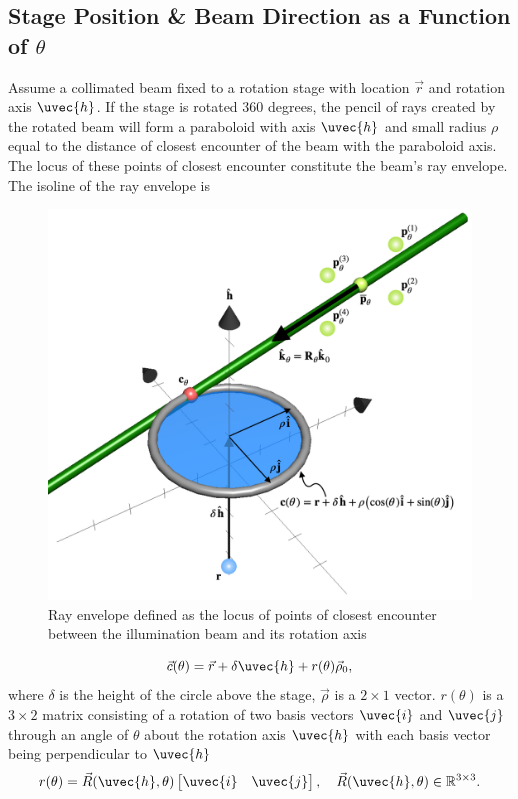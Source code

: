\subsection{Stage Position \& Beam Direction as a Function of $\theta$}
Assume a collimated beam fixed to a rotation stage with location $\vec{r}$ and rotation axis $\uvec{h}$. If the stage is rotated 360 degrees, the pencil of rays created by the rotated beam will form a paraboloid with axis $\uvec{h}$ and small radius $\rho$ equal to the distance of closest encounter of the beam with the paraboloid axis. The locus of these points of closest encounter constitute the beam's ray envelope. The isoline of the ray envelope is
%
\begin{figure}
    \centering
    \includegraphics[width=0.5\linewidth]{figures/ray_envelope.png}
    \caption{Ray envelope defined as the locus of points of closest encounter between the illumination beam and its rotation axis}
    \label{fig:ray_envelope_geometry}
\end{figure}
%
\begin{equation}
    \vec{c}(\theta) = \vec{r} + \delta \uvec{h} + r(\theta) \vec{\rho}_0,
    \label{eqn:envelope2}
\end{equation}
%
where $\delta$ is the height of the circle above the stage, $\vec{\rho}$ is a $2 \times 1$ vector. $r(\theta)$ is a $3 \times 2$ matrix consisting of a rotation of two basis vectors $\uvec{i}$ and $\uvec{j}$ through an angle of $\theta$ about the rotation axis $\uvec{h}$ with each basis vector being perpendicular to $\uvec{h}$
%
\begin{equation}
    r(\theta) = \vec{R}(\uvec{h}, \theta) \begin{bmatrix}
        \uvec{i} & \uvec{j}
    \end{bmatrix},
    \quad \vec{R}(\uvec{h}, \theta) \in \mathbb{R}^{3 \times 3}.
\end{equation}


